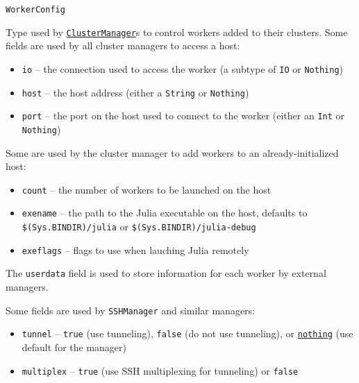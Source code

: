 \begin{adjustwidth}{2em}{0pt}


\begin{verbatim}
WorkerConfig
\end{verbatim}

Type used by \hyperlink{1673650075671996993}{\texttt{ClusterManager}}s to control workers added to their clusters. Some fields are used by all cluster managers to access a host:

\begin{itemize}
\item \texttt{io} – the connection used to access the worker (a subtype of \texttt{IO} or \texttt{Nothing})


\item \texttt{host} – the host address (either a \texttt{String} or \texttt{Nothing})


\item \texttt{port} – the port on the host used to connect to the worker (either an \texttt{Int} or \texttt{Nothing})

\end{itemize}
Some are used by the cluster manager to add workers to an already-initialized host:

\begin{itemize}
\item \texttt{count} – the number of workers to be launched on the host


\item \texttt{exename} – the path to the Julia executable on the host, defaults to \texttt{{\textquotedbl}\$(Sys.BINDIR)/julia{\textquotedbl}} or \texttt{{\textquotedbl}\$(Sys.BINDIR)/julia-debug{\textquotedbl}}


\item \texttt{exeflags} – flags to use when lauching Julia remotely

\end{itemize}
The \texttt{userdata} field is used to store information for each worker by external managers.

Some fields are used by \texttt{SSHManager} and similar managers:

\begin{itemize}
\item \texttt{tunnel} – \texttt{true} (use tunneling), \texttt{false} (do not use tunneling), or \hyperlink{9331422207248206047}{\texttt{nothing}} (use default for the manager)


\item \texttt{multiplex} – \texttt{true} (use SSH multiplexing for tunneling) or \texttt{false}



\end{itemize}
\end{adjustwidth}
